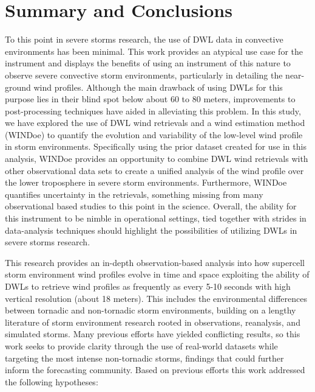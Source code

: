 \chapter{Summary and Conclusions}
\label{chap:discussion}

To this point in severe storms research, the use of DWL data in convective environments has been minimal. This work provides an atypical use case for the instrument and displays the benefits of using an instrument of this nature to observe severe convective storm environments, particularly in detailing the near-ground wind profiles. Although the main drawback of using DWLs for this purpose lies in their blind spot below  about 60 to 80 meters, improvements to post-processing techniques have aided in alleviating this problem. In this study, we have explored the use of DWL wind retrievals and a wind estimation method (WINDoe) to quantify the evolution and variability of the low-level wind profile in storm environments. Specifically using the prior dataset created for use in this analysis, WINDoe provides an opportunity to combine DWL wind retrievals with other observational data sets to create a unified analysis of the wind profile over the lower troposphere in severe storm environments. Furthermore, WINDoe quantifies uncertainty in the retrievals, something missing from many observational based studies to this point in the science. Overall, the ability for this instrument to be nimble in operational settings, tied together with strides in data-analysis techniques should highlight the possibilities of utilizing DWLs in severe storms research.

This research provides an in-depth observation-based analysis into how supercell storm environment wind profiles evolve in time and space exploiting the ability of DWLs to retrieve wind profiles as frequently as every 5-10 seconds with high vertical resolution (about 18 meters). This includes the environmental differences between tornadic and non-tornadic storm environments, building on a lengthy literature of storm environment research rooted in observations, reanalysis, and simulated storms. Many previous efforts have yielded conflicting results, so this work seeks to provide clarity through the use of real-world datasets while targeting the most intense non-tornadic storms, findings that could further inform the forecasting community. Based on previous efforts this work addressed the following hypotheses:

